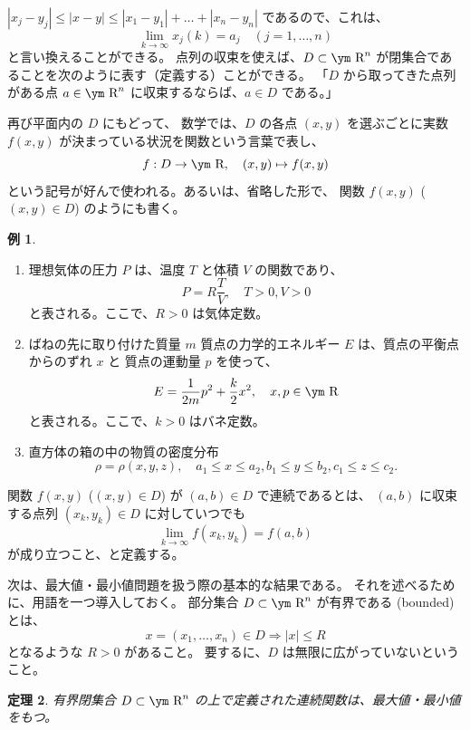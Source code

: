 \documentclass[a4paper]{jsarticle}
\newtheorem{Theorem}{定理}[section]
\theoremstyle{definition}
\newtheorem{Example}[Theorem]{例}
\theoremstyle{remark}
\newcommand{\R}{\text{\ym R}}
\begin{document}
$|x_j-y_j| \leq |x-y| \leq |x_1-y_1| + \dots + |x_n-y_n|$ であるので、これは、
\[
\lim_{k \to \infty} x_j(k) = a_j 
\quad 
(j=1,\dots, n)
\]
と言い換えることができる。
点列の収束を使えば、$D \subset \R^n$ が閉集合であることを次のように表す（定義する）ことができる。
「$D$ から取ってきた点列がある点 $a \in \R^n$ に収束するならば、$a \in D$ である。」

再び平面内の $D$ にもどって、
数学では、$D$ の各点 $(x,y)$ を選ぶごとに実数 $f(x,y)$ が決まっている状況を関数という言葉で表し、
\[
f: D \to \R, 
\quad 
(x,y) \mapsto f(x,y)
\]
という記号が好んで使われる。あるいは、省略した形で、
関数 $f(x,y)$ ($(x,y) \in D$) のようにも書く。

\begin{Example}
\begin{enumerate}
\item
理想気体の圧力 $P$ は、温度 $T$ と体積 $V$ の関数であり、
\[
P = R\frac{T}{V}, 
\quad T>0, V>0
\]
と表される。ここで、$R>0$ は気体定数。
\item
ばねの先に取り付けた質量 $m$ 質点の力学的エネルギー $E$ は、質点の平衡点からのずれ $x$ と
質点の運動量 $p$ を使って、
\[
E = \frac{1}{2m} p^2 + \frac{k}{2} x^2, 
\quad 
x, p \in \R
\]
と表される。ここで、$k>0$ はバネ定数。
\item
直方体の箱の中の物質の密度分布
\[
\rho = \rho(x,y,z),
\quad 
a_1 \leq x \leq a_2, b_1 \leq y \leq b_2, c_1 \leq z \leq c_2. 
\]
\end{enumerate}
\end{Example}

関数 $f(x,y)$ ($(x,y) \in D$) が $(a,b) \in D$ で連続であるとは、
$(a,b)$ に収束する点列 $(x_k,y_k) \in D$ に対していつでも
\[
\lim_{k \to \infty} f(x_k,y_k) = f(a,b)
\]
が成り立つこと、と定義する。

次は、最大値・最小値問題を扱う際の基本的な結果である。
それを述べるために、用語を一つ導入しておく。
部分集合 $D \subset \R^n$ が有界である (bounded) とは、
\[
x = (x_1,\dots,x_n) \in D \Longrightarrow |x| \leq R
\]
となるような $R>0$ があること。
要するに、$D$ は無限に広がっていないということ。

\begin{Theorem}\label{compact}
有界閉集合 $D \subset \R^n$ の上で定義された連続関数は、最大値・最小値をもつ。
\end{Theorem}
\end{document}
